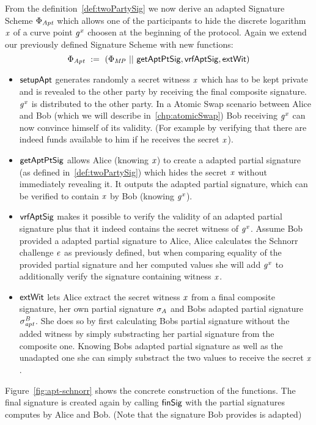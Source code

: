 \begin{definition}\label{def:twoPartyFixedWitAptSig}
    From the definition~\ref{def:twoPartySig} we now derive an adapted Signature Scheme $\Phi_{\mathit{Apt}}$ which allows one of the participants to hide the discrete logarithm $\mathit{x}$ of a curve point $\mathit{g}^{\mathit{x}}$ choosen
    at the beginning of the protocol. Again we extend our previously defined Signature Scheme with new functions:
    \[ \Phi_{\mathit{Apt}} ~:=~ (\Phi_{\mathit{MP}} ~||~ \mathsf{getAptPtSig}, \mathsf{vrfAptSig}, \mathsf{extWit}) \]
    \begin{itemize}
        \item $\mathsf{setupApt}$ generates randomly a secret witness $\mathit{x}$ which has to be kept private and is revealed to the other party by receiving the final composite signature. $\mathit{g}^{\mathit{x}}$ is distributed
        to the other party. In a Atomic Swap scenario between Alice and Bob (which we will describe in~\ref{chp:atomicSwap}) Bob receiving $\mathit{g}^{\mathit{x}}$ can now convince himself of its validity. (For example by verifying that
        there are indeed funds available to him if he receives the secret $\mathit{x}$).
        \item $\mathsf{getAptPtSig}$ allows Alice (knowing $\mathit{x}$) to create a adapted partial signature (as defined in~\ref{def:twoPartySig}) which hides the secret $\mathit{x}$ without immediately revealing it.
        It outputs the adapted partial signature, which can be verified to contain $\mathit{x}$ by Bob (knowing $\mathit{g}^{\mathit{x}}$).
        \item $\mathsf{vrfAptSig}$ makes it possible to verify the validity of an adapted partial signature plus that it indeed contains the secret witness of $\mathit{g}^{\mathit{x}}$. Assume Bob provided a adapted partial signature to Alice,
        Alice calculates the Schnorr challenge $\mathit{e}$ as previously defined, but when comparing equality of the provided partial signature and her computed values she will add $\mathit{g}^{\mathit{x}}$ to additionally
        verify the signature containing witness $\mathit{x}$.
        \item $\mathsf{extWit}$ lets Alice extract the secret witness $\mathit{x}$ from a final composite signature, her own partial signature $\sigma_{\mathit{A}}$ and Bobs adapted partial signature $\sigma^{\mathit{B}}_{\mathit{apt}}$. She does
        so by first calculating Bobs partial signature without the added witness by simply substracting her partial signature from the composite one. Knowing Bobs adapted partial signature as well as the unadapted one she
        can simply substract the two values to receive the secret $\mathit{x}$.
    \end{itemize}
    Figure~\ref{fig:apt-schnorr} shows the concrete construction of the functions. The final signature is created again by calling $\mathsf{finSig}$ with the partial signatures computes by Alice and Bob. (Note that the
    signature Bob provides is adapted)
\end{definition}

